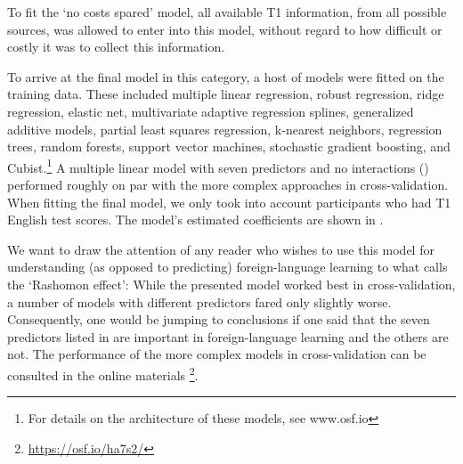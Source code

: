 \documentclass[output=paper]{langsci/langscibook}
\begin{document}
To fit the ‘no costs spared’ model, all available T1 information, from all possible sources, was allowed to enter into this model, without regard to how difficult or costly it was to collect this information. 

To arrive at the final model in this category, a host of models were fitted on the training data. These included multiple linear regression, robust regression, ridge regression, elastic net, multivariate adaptive regression splines, generalized additive models, partial least squares regression, k-nearest neighbors, regression trees, random forests, support vector machines, stochastic gradient boosting, and Cubist.\footnote{For details on the architecture of these models, see www.osf.io} A multiple linear model with seven predictors and no interactions () performed roughly on par with the more complex approaches in cross-validation. When fitting the final model, we only took into account participants who had T1 English test scores. The model’s estimated coefficients are shown in . 

We want to draw the attention of any reader who wishes to use this model for understanding (as opposed to predicting) foreign-language learning to what \citet{Breiman2001} calls the ‘Rashomon effect’: While the presented model worked best in cross-validation, a number of models with different predictors fared only slightly worse. Consequently, one would be jumping to conclusions if one said that the seven predictors listed in  are important in foreign-language learning and the others are not. The performance of the more complex models in cross-validation can be consulted in the online materials \footnote{\url{https://osf.io/ha7s2/}}.
\end{document}
